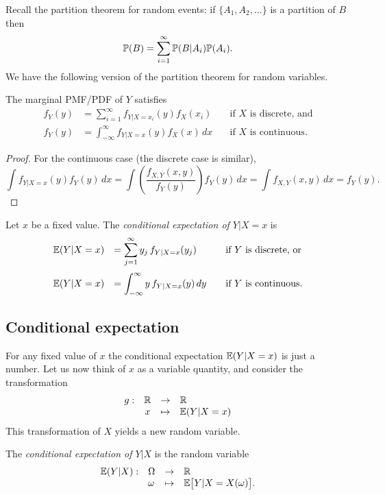 \bigskip
Recall the partition theorem for random events: if $\{A_1,A_2,\ldots\}$ is a partition of $B$ then
\[
\mathbb{P}(B) = \sum_{i=1}^{\infty} \mathbb{P}(B|A_i)\mathbb{P}(A_i).
\]
We have the following version of the partition theorem for random variables. 

\begin{theorem}\label{thm:partition_for_rvs}
The marginal PMF/PDF of $Y$ satisfies
\[\begin{array}{lll}
f_Y(y) & = \displaystyle
	\sum_{i=1}^{\infty} 		f_{Y|X=x_i}(y)f_X(x_i)		& \quad\text{if $X$ is discrete, and} \\[4ex]
f_Y(y) & = \displaystyle
	\int_{-\infty}^{\infty} 	f_{Y|X=x}(y)f_X(x)\,dx		& \quad\text{if $X$ is continuous.} 
\end{array}
\]
\end{theorem}
\begin{proof}
For the continuous case (the discrete case is similar),
\[
\int f_{Y|X=x}(y) f_Y(y)\,dx 
	= \int \left(\frac{f_{X,Y}(x,y)}{f_Y(y)}\right) f_Y(y)\,dx
	= \int f_{X,Y}(x,y)\,dx
	= f_Y(y).
\]
\end{proof}

\begin{definition}\label{def:cond_expe_x}
Let $x$ be a fixed value. The \emph{conditional expectation of $Y|X=x$} is 
\[
\begin{array}{lll}
\mathbb{E}(Y|X=x) & = \displaystyle\sum_{j=1}^{\infty} y_j\,f_{Y|X=x}(y_j)		& \quad\text{if $Y$ is discrete, or} \\[4ex]
\mathbb{E}(Y|X=x) & = \displaystyle\int_{-\infty}^{\infty} y\,f_{Y|X=x}(y)\,dy	& \quad\text{if $Y$ is continuous.} 
\end{array}
\]
\end{definition}

\subsection{Conditional expectation}


For any fixed value of $x$ the conditional expectation $\mathbb{E}(Y|X=x)$ is just a number. Let us now think of $x$ as a variable quantity, and consider the transformation
\[
\begin{array}{rccl}
	g:	& \mathbb{R}	& \to		& \mathbb{R} \\
		& x		& \mapsto	& \mathbb{E}(Y|X=x)
\end{array}
\]
This transformation of $X$ yields a new random variable.
\begin{definition}\label{def:cond_expe}
The \emph{conditional expectation of $Y|X$} is the random variable
\[\begin{array}{llll}
\mathbb{E}(Y|X):	& \Omega 	& \to 		& \mathbb{R} \\
			& \omega	& \mapsto 	& \mathbb{E}\big[Y|X=X(\omega)\big].
\end{array}\]
\end{definition}

